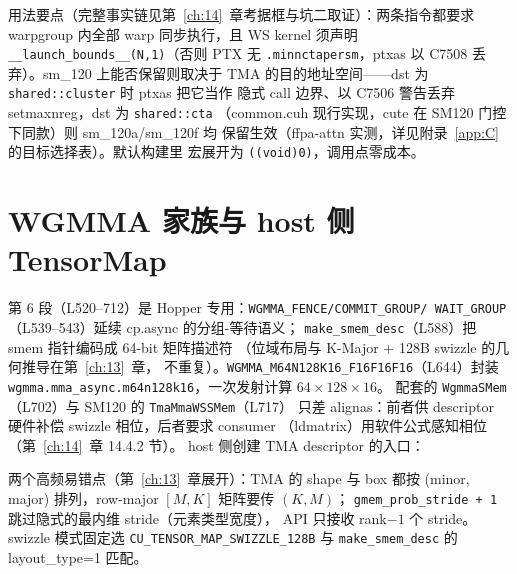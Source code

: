 

用法要点（完整事实链见第~\ref{ch:14}~章考据框与坑二取证）：两条指令都要求
warpgroup 内全部 warp 同步执行，且 WS kernel 须声明
\texttt{\_\allowbreak{}\_\allowbreak{}launch\_\allowbreak{}bounds\_\allowbreak{}\_\allowbreak{}(N,\allowbreak{}1)}（否则 PTX 无
\texttt{.minnctapersm}，ptxas 以 C7508 丢弃）。sm\_120 上能否保留则取决于
TMA 的目的地址空间——dst 为 \texttt{shared::cluster} 时 ptxas 把它当作
隐式 call 边界、以 C7506 警告丢弃 setmaxnreg，dst 为 \texttt{shared::cta}
（common.cuh 现行实现，cute 在 SM120 门控下同款）则 sm\_120a/sm\_120f 均
保留生效（ffpa-attn 实测，详见附录~\ref{app:C} 的目标选择表）。默认构建里
宏展开为 \texttt{((void)0)}，调用点零成本。

\section{WGMMA 家族与 host 侧 TensorMap}

第 6 段（L520--712）是 Hopper 专用：\texttt{WGMMA\_\allowbreak{}FENCE/\allowbreak{}COMMIT\_\allowbreak{}GROUP/\allowbreak{}
WAIT\_\allowbreak{}GROUP}（L539--543）延续 cp.async 的分组-等待语义；
\texttt{make\_\allowbreak{}smem\_\allowbreak{}desc}（L588）把 smem 指针编码成 64-bit 矩阵描述符
（位域布局与 K-Major + 128B swizzle 的几何推导在第~\ref{ch:13}~章，
不重复）。\texttt{WGMMA\_\allowbreak{}M64\allowbreak{}N128\allowbreak{}K16\_\allowbreak{}F16\allowbreak{}F16\allowbreak{}F16}（L644）封装
\texttt{wgmma.\allowbreak{}mma\_\allowbreak{}async.\allowbreak{}m64n128k16}，一次发射计算 $64\times128\times16$。
配套的 \texttt{WgmmaSMem}（L702）与 SM120 的 \texttt{Tma\allowbreak{}Mma\allowbreak{}WSSMem}（L717）
只差 alignas：前者供 descriptor 硬件补偿 swizzle 相位，后者要求 consumer
（ldmatrix）用软件公式感知相位（第~\ref{ch:14}~章 14.4.2 节）。
host 侧创建 TMA descriptor 的入口：



两个高频易错点（第~\ref{ch:13}~章展开）：TMA 的 shape 与 box 都按
(minor, major) 排列，row-major $[M,K]$ 矩阵要传 $(K,M)$；
\texttt{gmem\_\allowbreak{}prob\_\allowbreak{}stride + 1} 跳过隐式的最内维 stride（元素类型宽度），
API 只接收 rank$-1$ 个 stride。swizzle 模式固定选
\texttt{CU\_\allowbreak{}TENSOR\_\allowbreak{}MAP\_\allowbreak{}SWIZZLE\_\allowbreak{}128\allowbreak{}B} 与 \texttt{make\_\allowbreak{}smem\_\allowbreak{}desc} 的
layout\_type=1 匹配。

